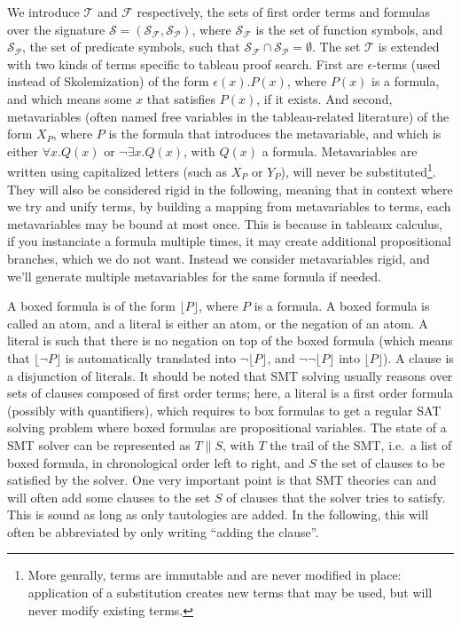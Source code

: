 We introduce $\mathcal{T}$ and $\mathcal{F}$ respectively,
the sets of first order terms and formulas over the signature
$\mathcal{S}=(\mathcal{S}_\mathcal{F},\mathcal{S}_\mathcal{P})$, where
$\mathcal{S}_\mathcal{F}$ is the set of function symbols, and
$\mathcal{S}_\mathcal{P}$, the set of predicate symbols, such that
$\mathcal{S}_\mathcal{F}\cap\mathcal{S}_\mathcal{P}=\emptyset$. The set
$\mathcal{T}$ is extended with two kinds of terms specific to tableau proof
search. First are $\epsilon{}$-terms (used instead of Skolemization) of the form
$\epsilon(x).P(x)$, where $P(x)$ is a formula, and which means some $x$ that
satisfies $P(x)$, if it exists. And second, metavariables (often named free variables in
the tableau-related literature) of the form $X_P$, where $P$ is the formula that
introduces the metavariable, and which is either $\forall{}x.Q(x)$ or
$\neg\exists{}x.Q(x)$, with $Q(x)$ a formula. Metavariables are written using capitalized
letters (such as $X_P$ or $Y_P$), will never be substituted\footnote{More genrally, terms
are immutable and are never modified in place: application of a substitution creates new terms
that may be used, but will never modify existing terms.}. They will also be considered
rigid in the following, meaning that in context where we try and unify terms, by building
a mapping from metavariables to terms, each metavariables may be bound at most once.
This is because in tableaux calculus, if you instanciate a formula multiple times,
it may create additional propositional branches, which we do not want. Instead we consider
metavariables rigid, and we'll generate multiple metavariables for the same formula
if needed.

A boxed formula is of the form $\lfloor{}P\rfloor$, where $P$ is a formula. A
boxed formula is called an atom, and a literal is either an atom, or the negation
of an atom. A literal is such that there is no negation on top of the boxed
formula (which means that $\lfloor\neg{}P\rfloor$ is automatically translated into
$\neg\lfloor{}P\rfloor$, and $\neg\neg\lfloor{}P\rfloor$ into $\lfloor{}P\rfloor$).
A clause is a disjunction of literals. It should be noted that SMT solving usually
reasons over sets of clauses composed of first order terms; here, a literal is a first order
formula (possibly with quantifiers), which requires to box formulas to get a
regular SAT solving problem where boxed formulas are propositional variables.
The state of a SMT solver can be represented as $T \parallel S$,
with $T$ the trail of the SMT, i.e.~a list of boxed formula, in chronological order left to right,
and $S$ the set of clauses to be satisfied by the solver. One very important point is that SMT theories
can and will often add some clauses to the set $S$ of clauses that the solver
tries to satisfy. This is sound as long as only tautologies are added. In the following,
this will often be abbreviated by only writing ``adding the clause''.

